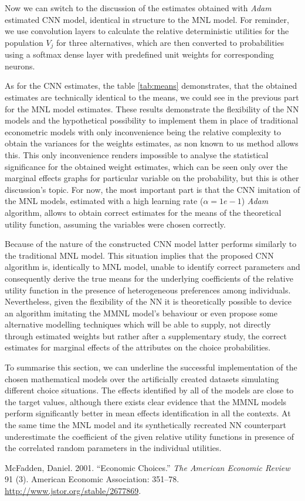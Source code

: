 \documentclass[11pt,]{article}
\begin{document}
Now we can switch to the discussion of the estimates obtained with
\emph{Adam} estimated CNN model, identical in structure to the MNL
model. For reminder, we use convolution layers to calculate the relative
deterministic utilities for the population \(V_j\) for three
alternatives, which are then converted to probabilities using a softmax
dense layer with predefined unit weights for corresponding neurons.

As for the CNN estimates, the table \ref{tab:means} demonstrates, that
the obtained estimates are technically identical to the means, we could
see in the previous part for the MNL model estimates. These results
demonstrate the flexibility of the NN models and the hypothetical
possibility to implement them in place of traditional econometric models
with only inconvenience being the relative complexity to obtain the
variances for the weights estimates, as non known to us method allows
this. This only inconvenience renders impossible to analyse the
statistical significance for the obtained weight estimates, which can be
seen only over the marginal effects graphs for particular variable on
the probability, but this is other discussion's topic. For now, the most
important part is that the CNN imitation of the MNL models, estimated
with a high learning rate (\(\alpha = 1e-1\)) \emph{Adam} algorithm,
allows to obtain correct estimates for the means of the theoretical
utility function, assuming the variables were chosen correctly.

Because of the nature of the constructed CNN model latter performs
similarly to the traditional MNL model. This situation implies that the
proposed CNN algorithm is, identically to MNL model, unable to identify
correct parameters and consequently derive the true means for the
underlying coefficients of the relative utility function in the presence
of heterogeneous preferences among individuals. Nevertheless, given the
flexibility of the NN it is theoretically possible to device an
algorithm imitating the MMNL model's behaviour or even propose some
alternative modelling techniques which will be able to supply, not
directly through estimated weights but rather after a supplementary
study, the correct estimates for marginal effects of the attributes on
the choice probabilities.

To summarise this section, we can underline the successful
implementation of the chosen mathematical models over the artificially
created datasets simulating different choice situations. The effects
identified by all of the models are close to the target values, although
there exists clear evidence that the MMNL models perform significantly
better in mean effects identification in all the contexts. At the same
time the MNL model and its synthetically recreated NN counterpart
underestimate the coefficient of the given relative utility functions in
presence of the correlated random parameters in the individual
utilities.

\FloatBarrier

\hypertarget{refs}{}
\leavevmode\hypertarget{ref-mcfadden2001ec}{}%
McFadden, Daniel. 2001. ``Economic Choices.'' \emph{The American
Economic Review} 91 (3). American Economic Association: 351--78.
\url{http://www.jstor.org/stable/2677869}.
\end{document}
